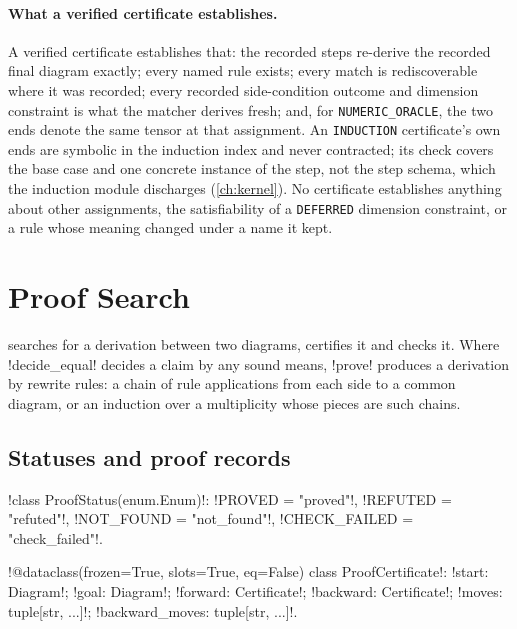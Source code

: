 \paragraph{What a verified certificate establishes.} A verified certificate establishes that: the recorded steps re-derive the recorded final diagram exactly; every named rule exists; every match is rediscoverable where it was recorded; every recorded side-condition outcome and dimension constraint is what the matcher derives fresh; and, for \texttt{NUMERIC\_ORACLE}, the two ends denote the same tensor at that assignment. An \texttt{INDUCTION} certificate's own ends are symbolic in the induction index and never contracted; its check covers the base case and one concrete instance of the step, not the step schema, which the induction module discharges (\cref{ch:kernel}). No certificate establishes anything about other assignments, the satisfiability of a \texttt{DEFERRED} dimension constraint, or a rule whose meaning changed under a name it kept.

\section{Proof Search}\label{sec:proofs-prove}

 searches for a derivation between two diagrams, certifies it and checks it. Where \py!decide_equal! decides a claim by any sound means, \py!prove! produces a derivation by rewrite rules: a chain of rule applications from each side to a common diagram, or an induction over a multiplicity whose pieces are such chains.

\subsection{Statuses and proof records}

\begin{signature}
\py!class ProofStatus(enum.Enum)!: \py!PROVED = "proved"!, \py!REFUTED = "refuted"!, \py!NOT_FOUND = "not_found"!, \py!CHECK_FAILED = "check_failed"!.
\end{signature}

\begin{signature}
\py!@dataclass(frozen=True, slots=True, eq=False) class ProofCertificate!: \py!start: Diagram!; \py!goal: Diagram!; \py!forward: Certificate!; \py!backward: Certificate!; \py!moves: tuple[str, ...]!; \py!backward_moves: tuple[str, ...]!.
\end{signature}

